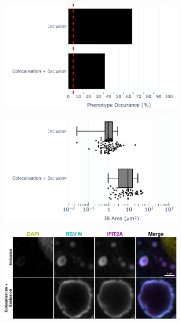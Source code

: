 \begin{figure}
    \begin{subfigure}{0.5\textwidth}
        \caption{}
        \includegraphics[width=1\linewidth]{10. Chapter 5/Figs/01. Infection/01. IFIT2A/13. bar_i2a_mdbk.pdf} 
    \end{subfigure}
    \begin{subfigure}{0.5\textwidth}
        \caption{}
        \includegraphics[width=1\linewidth]{10. Chapter 5/Figs/01. Infection/01. IFIT2A/14. box_i2a_mdbk.pdf}
    \end{subfigure}
    \begin{subfigure}{1\textwidth}
        \caption{}
        \includegraphics[width=1\linewidth]{10. Chapter 5/Figs/01. Infection/01. IFIT2A/15. i2a mdbk brsv.pdf} 

\end{subfigure}
\end{figure}

